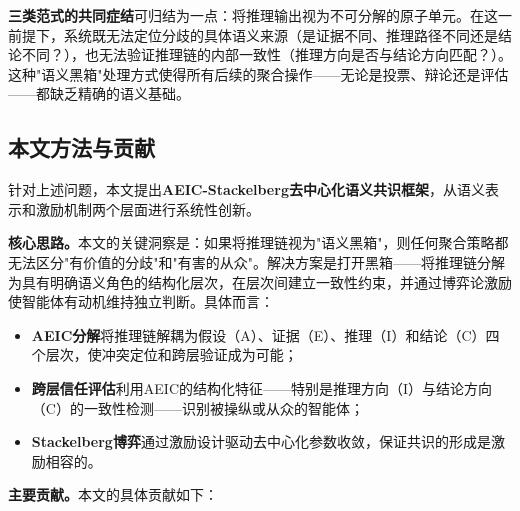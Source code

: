 \documentclass[12pt,a4paper,UTF8,fontset=fandol]{ctexart}
\begin{document}
\textbf{三类范式的共同症结}可归结为一点：将推理输出视为不可分解的原子单元。在这一前提下，系统既无法定位分歧的具体语义来源（是证据不同、推理路径不同还是结论不同？），也无法验证推理链的内部一致性（推理方向是否与结论方向匹配？）。这种"语义黑箱"处理方式使得所有后续的聚合操作——无论是投票、辩论还是评估——都缺乏精确的语义基础。

\subsection{本文方法与贡献}

针对上述问题，本文提出\textbf{AEIC-Stackelberg去中心化语义共识框架}，从语义表示和激励机制两个层面进行系统性创新。

\textbf{核心思路。}本文的关键洞察是：如果将推理链视为"语义黑箱"，则任何聚合策略都无法区分"有价值的分歧"和"有害的从众"。解决方案是打开黑箱——将推理链分解为具有明确语义角色的结构化层次，在层次间建立一致性约束，并通过博弈论激励使智能体有动机维持独立判断。具体而言：
\begin{itemize}[nosep]
    \item \textbf{AEIC分解}将推理链解耦为假设（A）、证据（E）、推理（I）和结论（C）四个层次，使冲突定位和跨层验证成为可能；
    \item \textbf{跨层信任评估}利用AEIC的结构化特征——特别是推理方向（I）与结论方向（C）的一致性检测——识别被操纵或从众的智能体；
    \item \textbf{Stackelberg博弈}通过激励设计驱动去中心化参数收敛，保证共识的形成是激励相容的。
\end{itemize}

\textbf{主要贡献。}本文的具体贡献如下：
\end{document}
